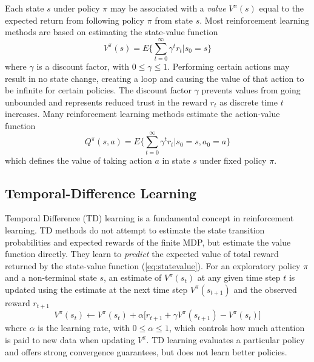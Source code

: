 Each state $s$ under policy $\pi$ may be associated with a \textit{value}
$V^\pi(s)$ equal to the expected return from following policy $\pi$ from state
$s$.  Most reinforcement learning methods are based on estimating the
state-value function
\begin{equation}
\label{eq:statevalue}
V^\pi(s) = E \Bigg\lbrace \sum^\infty_{t=0} \gamma^t r_t \Bigg\vert s_0 = s
\Bigg\rbrace
\end{equation}
where $\gamma$ is a discount factor, with $0\leq \gamma \leq 1$.
Performing certain actions may result in no state change, creating a loop and
causing the value of that action to be infinite for certain policies.
The discount factor $\gamma$ prevents values from going unbounded and
represents reduced trust in the reward $r_t$ as discrete time $t$
increases.  Many reinforcement learning methods estimate the action-value
function
\begin{equation}
\label{eq:actionvalue}
Q^\pi(s,a) = E \Bigg\lbrace \sum^\infty_{t=0} \gamma^t r_t \Bigg\vert s_0 = s,
a_0 = a \Bigg\rbrace
\end{equation}
which defines the value of taking action $a$ in state $s$ under fixed policy
$\pi$.

\subsection{Temporal-Difference Learning}
Temporal Difference (TD) learning is a fundamental concept in reinforcement
learning. TD methods do not attempt to estimate the state transition probabilities and
expected rewards of the finite MDP, but estimate the value function directly.
They learn to \textit{predict} the expected value of total reward returned by
the state-value function (\ref{eq:statevalue}).  For an exploratory policy $\pi$
and a non-terminal state $s$, an estimate of $V^\pi(s_t)$ at any given time step
$t$ is updated using the estimate at the next time step $V^\pi(s_{t+1})$ and the
observed reward $r_{t+1}$
\begin{equation}
V^\pi(s_t) \leftarrow V^\pi(s_t) + \alpha \bigl[r_{t+1} + \gamma
V^\pi(s_{t+1}) - V^\pi(s_t) \bigr]
\end{equation}
where $\alpha$ is the learning rate, with $0 \leq \alpha \leq 1$, which controls
how much attention is paid to new data when updating $V^\pi$.  TD learning
evaluates a particular policy and offers strong convergence guarantees, but does
not learn better policies.

